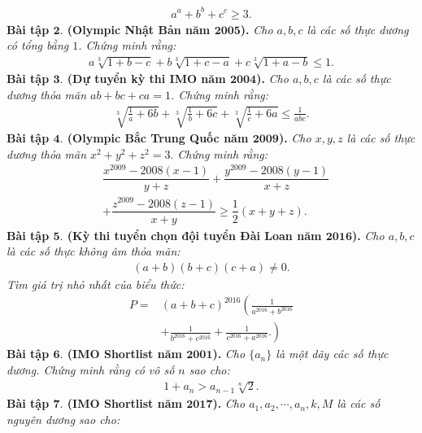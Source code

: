\begin{multicols}{2}
		\begin{align*}
			a^a + b^b + c^c \ge 3.
		\end{align*}
		\textbf{\color{hoccungpi}Bài tập $\pmb{2.}$ (Olympic Nhật Bản năm $\pmb{2005}$).}
		\textit{Cho $a, b, c$ là các số thực dương có tổng bằng $1$. Chứng minh rằng:}
		\begin{align*}
			a \sqrt[3]{\!1\!+\!b\!-\!c}\!+\!b \sqrt[3]{\!1\!+\!c\!-\!a}\!+\!c \sqrt[3]{\!1\!+\!a\!-\!b} \!\leq\! 1 .
		\end{align*}
		\textbf{\color{hoccungpi}Bài tập $\pmb{3.}$ (Dự tuyển kỳ thi IMO năm $\pmb{2004}$).}
		\textit{Cho $a,b,c$ là các số thực dương thỏa mãn $ab+bc+ca=1$. Chứng minh rằng:}
		\begin{align*}
			\sqrt[3]{\frac{1}{a}+6 b}+\sqrt[3]{\frac{1}{b}+6 c}+\sqrt[3]{\frac{1}{c}+6 a} \leq \frac{1}{a b c}.
		\end{align*}
		\textbf{\color{hoccungpi}Bài tập $\pmb{4.}$ (Olympic Bắc Trung Quốc  năm $\pmb{2009}$).}
		\textit{Cho $x,y,z$ là các số thực dương thỏa mãn $ x^2+y^2+z^2 = 3.$ Chứng minh rằng:}
		\begin{align*}
				&\dfrac{{{x^{2009}} - 2008(x - 1)}}{{y + z}} + \dfrac{{{y^{2009}} - 2008(y - 1)}}{{x + z}} \\
				&+ \dfrac{{{z^{2009}} - 2008(z - 1)}}{{x + y}} \ge \dfrac{1}{2}(x + y + z).
		\end{align*}
		\textbf{\color{hoccungpi}Bài tập $\pmb{5.}$ (Kỳ thi tuyển chọn đội tuyển Đài Loan năm $\pmb{2016}$).}
		\vskip 0.1cm
		\textit{Cho $a,b,c$ là các số thực không âm thỏa mãn:
		\begin{align*}
			(a+b)(b+c)(c+a) \neq 0.
		\end{align*}
		Tìm giá trị nhỏ nhất của biểu thức:}
		\begin{align*}
			P=&{(a + b + c)^{2016}}\left(\frac{1}{{{a^{2016}} + {b^{2016}}}}\right.\\
			 &\left.+ \frac{1}{{{b^{2016}} + {c^{2016}}}} + \frac{1}{{{c^{2016}} + {a^{2016}}}}.\right)
		\end{align*}
		\textbf{\color{hoccungpi}Bài tập $\pmb{6.}$ (IMO Shortlist năm $\pmb{2001}$).} \textit{Cho $\{a_n\}$ là một dãy các số thực dương. Chứng minh rằng có vô số $n$ sao cho:}
		\begin{align*}
			1 + a_n > a_{n-1} \sqrt[n]{2}.
		\end{align*}
		\textbf{\color{hoccungpi}Bài tập $\pmb{7.}$ (IMO Shortlist năm $\pmb{2017}$).}
		\textit{Cho $a_1,a_2,\cdots,a_n,k,M$ là các số nguyên dương sao cho: 
		\begin{align*}

\end{align*}}
\end{multicols}
